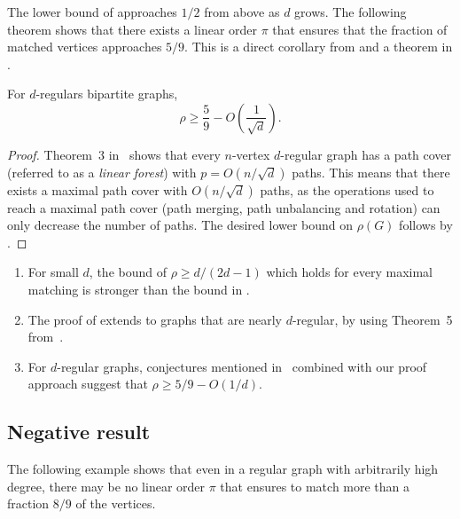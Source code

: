 \documentclass{toc}
\theoremstyle{plain}
\begin{document}
The lower bound of  approaches
%
%
$1/2$ from above as $d$ grows.  
The following theorem shows that there exists %
%
%
%
%
a   %
linear order $\pi$ that ensures that the fraction of matched vertices approaches $5/9$.
This is a direct corollary from  and a theorem in \cite{FeigeRS14}.

%
\begin{corollary}
	\label{cor:regular}
	For $d$-regulars bipartite graphs, 
$$\rho \ge \frac{5}{9} - O\left(\frac{1}{\sqrt{d}}\right).$$	
\end{corollary}

\begin{proof}
  Theorem~3 in~\cite{FeigeRS14} shows that every $n$-vertex $d$-regular graph has a path cover (referred to as a \emph{linear forest}) with  $p = O(n/\sqrt{d})$ paths. This means that there exists a maximal path cover with $O(n/\sqrt{d})$ paths, as the operations used to reach a maximal path cover (path merging, path unbalancing and rotation) can only decrease the number of paths.
%
%
The desired lower bound on $\rho(G)$ follows by . %
%
%
%
\end{proof}

\begin{remark}
\begin{enumerate}
	
	\item For small $d$, the bound of $\rho \ge d/(2d - 1)$ which holds for every maximal matching is stronger than the bound in .
	
	\item The proof of  extends to graphs that are nearly $d$-regular, by using Theorem~5 from~\cite{FeigeRS14}.
	
	\item For $d$-regular graphs, conjectures mentioned in~\cite{FeigeRS14} combined with our proof approach suggest that $\rho \ge 5/9 - O(1/d)$.
	
\end{enumerate}
\end{remark}

\subsection{Negative result}
\label{sec:regular-neg}

The following example shows that even in a regular graph with arbitrarily high degree, there may be no linear order $\pi$ that ensures to match more than a fraction $8/9$ of the vertices.
\end{document}
